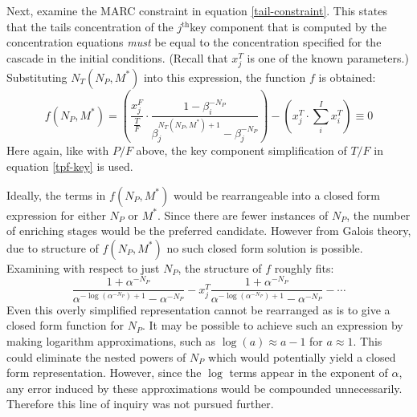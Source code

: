 \documentclass[preprint,12pt]{elsarticle}
\newcommand{\superscript}[1]{\ensuremath{^{\textrm{#1}}}}
\newcommand{\jth}[0]{$j$\superscript{th}}
\begin{document}
Next, examine the MARC constraint in equation \ref{tail-constraint}.  This states that
the tails concentration of the \jth key component that is computed by the concentration
equations \emph{must} be equal to the concentration specified for the cascade in the
initial conditions.  (Recall that $x_j^T$ is one of the known parameters.)  
Substituting $N_T(N_P, M^*)$ into this expression, the function $f$ is obtained:
\begin{equation}
f(N_P,M^*) =
\left(\frac{x_j^F}{\frac{T}{F}} \cdot \frac{1 - \beta_i^{-N_P}}
                                           {\beta_j^{N_T(N_P,M^*)+1} - \beta_j^{-N_P}} \right)
- \left(x_j^T\cdot\sum_i^{I} x_i^T\right) \equiv 0
\end{equation}
Here again, like with $P/F$ above, the key component simplification of $T/F$ in 
equation \ref{tpf-key} is used.

Ideally, the terms in $f(N_P,M^*)$ would be rearrangeable into a closed form expression
for either $N_P$ or $M^*$.  Since there are fewer instances of $N_P$, the number of
enriching stages would be the preferred candidate.  However from Galois theory, 
due to structure of $f(N_P,M^*)$ no such closed form solution is possible.  Examining
with respect to just $N_P$, the structure of $f$ roughly fits:
\begin{equation}
\frac{1 + \alpha^{-N_P}}{\alpha^{-\log(\alpha^{-N_P})+1} - \alpha^{-N_P}} - x_j^T
    \frac{1 + \alpha^{-N_P}}{\alpha^{-\log(\alpha^{-N_P})+1} - \alpha^{-N_P}} -
    \cdots 
\end{equation}
Even this overly simplified representation cannot be rearranged as is to give a 
closed form function for $N_P$.  It may be possible to achieve such an expression 
by making logarithm approximations, such as $\log(a) \approx a - 1$ for $a\approx1$.  
This could 
eliminate the nested powers of $N_P$ which would potentially yield
a closed form representation.  However, since the $\log$ terms appear in the exponent
of $\alpha$, any error induced by these approximations would be compounded 
unnecessarily.  Therefore this line of inquiry was not pursued further.
\end{document}
